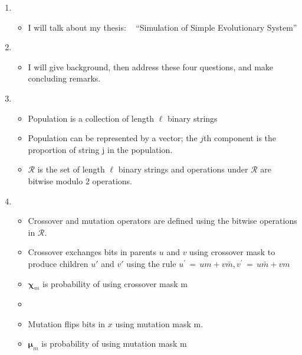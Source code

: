 \documentclass{article}
\begin{document}
\setcounter{page}{1}    
\newlength{\mywidth}
\setlength{\mywidth}{0.9\linewidth}
\newlength{\myheight}
\setlength{\myheight}{0.5in}
    
\begin{enumerate}
\item
  \begin{itemize}
  \item I will talk about my thesis: \hfill\mbox{ }\linebreak
      ``Simulation of Simple Evolutionary System'' 
  \end{itemize}
    
\item
  \begin{itemize}
  \item
      I will give background, then address these four questions, and make
      concluding remarks.    
  \end{itemize}

\item
  \begin{itemize}
  \item Population is a collection of length $\ell$ binary strings 
  \item Population can be represented by a vector; the $j$th component
      is the proportion of string j in the population.
    \item $\mathcal{R}$ is the set of length $\ell$ binary strings and operations under $\mathcal{R}$ are bitwise modulo 2 operations.
  \end{itemize}
    
\item
  \begin{itemize}
  \item Crossover and mutation operators are defined using the
    bitwise operations in $\mathcal{R}$.
  \item Crossover exchanges bits in parents $u$ and $v$ using crossover mask to produce children $u'$ and $v'$ 
  using the rule $u^\prime \,=\, um + v\bar{m} , v^\prime \,=\, u\bar{m} + vm$
  \item $\bm{\chi}_m$ is probability of using crossover mask m
  \item
  \item Mutation flips bits in $x$ using mutation mask m.
  \item $\bm{\mu}_m$ is probability of using mutation mask m
  \end{itemize}
    

\end{enumerate}
\end{document}
